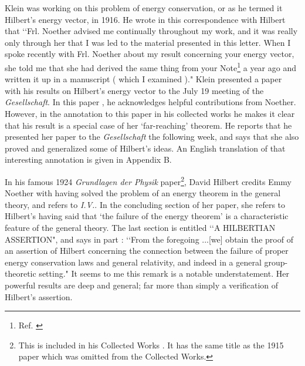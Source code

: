\documentclass[12pt]{article}
\begin{document}
 Klein was working on this problem of energy conservation, or as he
termed it Hilbert's energy vector, in 1916.   He wrote in this correspondence 
with Hilbert that
\lq\lq Frl.  Noether advised me continually throughout my work, and it was really only
through her that I was led to the material presented in this letter.  When I spoke recently
with Frl.  Noether about my result concerning your energy vector, she told me that she had
derived the same thing from your Note\footnote{ Ref.  \cite{hilbert}} a year ago and written
it up in a manuscript ( which I examined )."  Klein presented a paper 
with his results 
 on Hilbert's energy
vector to the July 19 meeting of the {\it{Gesellschaft}}.   In this paper
\cite{kleinpap}, he
acknowledges helpful contributions from Noether. However, in the annotation
to this paper in his
collected works he makes it clear that his result is a special case of her
`far-reaching' theorem.  He reports that he presented her paper to the {\it{Gesellschaft}}
the following week, and  says that she also proved and generalized some of Hilbert's
ideas.  An English translation of that interesting annotation is given in Appendix B.


In his famous
1924 {\it{Grundlagen der Physik}} paper\footnote{ This is included in his Collected Works
\cite{hilbert1}.   It has the same title as the 1915 paper which was omitted from the
 Collected Works.}, David Hilbert credits  Emmy  Noether  with having
solved the problem of an energy theorem in the general  theory, and refers to 
 {\it{I.V.}}. In the concluding section of her paper, she refers to Hilbert's having said that `the failure of
the energy theorem' is a characteristic feature of the general theory. 
 The last section is entitled
 \lq\lq A HILBERTIAN ASSERTION", and says in part  \cite{basil}:  \lq\lq From the foregoing
...[we] obtain the proof of an assertion of Hilbert concerning the connection between the
failure of proper energy conservation laws and general relativity, and indeed in a general
group-theoretic setting."  It seems to me this remark is a notable understatement.  Her powerful results are
 deep and  general; far more  than simply a  verification of Hilbert's assertion.
\end{document}
